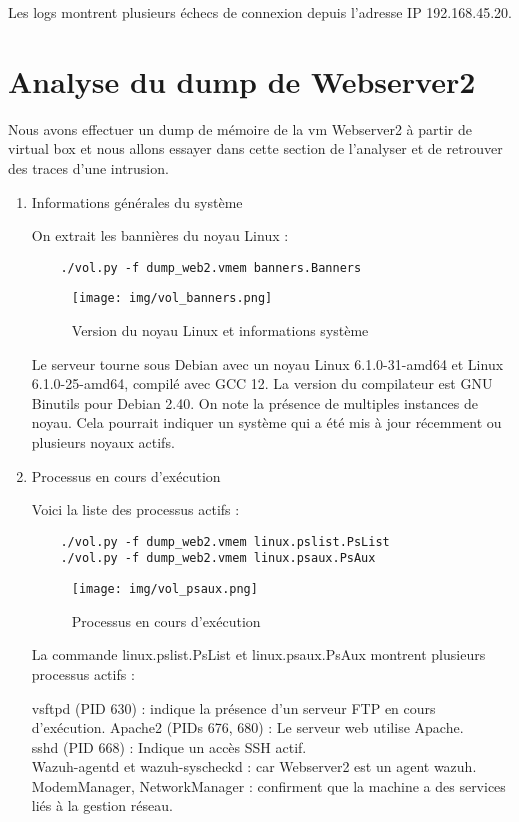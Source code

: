 \documentclass[a4paper,12pt]{report}
\begin{document}
Les logs montrent plusieurs échecs de connexion depuis l'adresse IP 192.168.45.20.

\section{Analyse du dump de Webserver2}

Nous avons effectuer un dump de mémoire de la vm Webserver2 à partir de virtual box et nous allons essayer dans cette section de l'analyser et de retrouver des traces d'une intrusion. 
\begin{enumerate}
    \item{Informations générales du système}

    On extrait les bannières du noyau Linux :
    \begin{verbatim}
    ./vol.py -f dump_web2.vmem banners.Banners
    \end{verbatim}
    \begin{figure}[h]
        \centering
        \texttt{[image: img/vol\_banners.png]}
        \caption{Version du noyau Linux et informations système}
    \end{figure}
Le serveur tourne sous Debian avec un noyau Linux 6.1.0-31-amd64 et Linux 6.1.0-25-amd64, compilé avec GCC 12. La version du compilateur est GNU Binutils pour Debian 2.40.
On note la présence de multiples instances de noyau. Cela pourrait indiquer un système qui a été mis à jour récemment ou plusieurs noyaux actifs.

\item{Processus en cours d’exécution}

    Voici la liste des processus actifs :
    \begin{verbatim}
    ./vol.py -f dump_web2.vmem linux.pslist.PsList
    ./vol.py -f dump_web2.vmem linux.psaux.PsAux
    \end{verbatim}
    \begin{figure}[H]
        \centering
        \texttt{[image: img/vol\_psaux.png]}
        \caption{Processus en cours d'exécution}
    \end{figure}
La commande linux.pslist.PsList et linux.psaux.PsAux montrent plusieurs processus actifs :

    vsftpd (PID 630) : indique la présence d’un serveur FTP en cours d’exécution.
    Apache2 (PIDs 676, 680) : Le serveur web utilise Apache.\\
    sshd (PID 668) : Indique un accès SSH actif.\\
    Wazuh-agentd et wazuh-syscheckd : car Webserver2 est un agent wazuh.\\
    ModemManager, NetworkManager : confirment que la machine a des services liés à la gestion réseau.


\end{enumerate}
\end{document}
